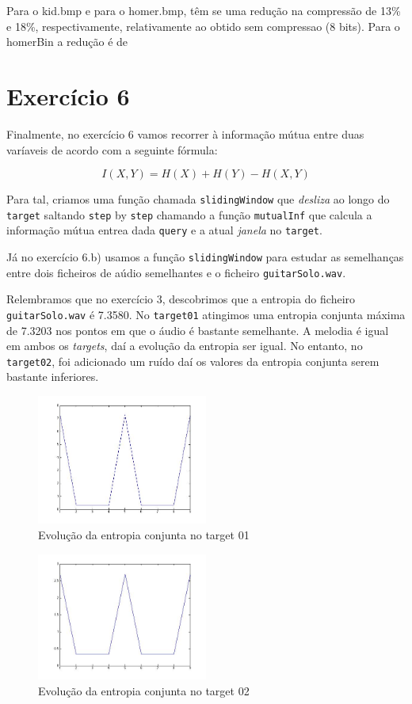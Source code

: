 \documentclass[12pt]{article}
\begin{document}
Para o kid.bmp e para o homer.bmp, têm se uma redução na compressão de 13\% e 18\%, respectivamente, relativamente ao obtido sem compressao (8 bits). Para o homerBin a redução é de 


\section*{Exercício 6}

  Finalmente, no exercício 6 vamos recorrer à informação mútua entre duas
  varíaveis de acordo com a seguinte fórmula:

  $$
    I(X,Y) = H(X) + H(Y) - H(X,Y)
  $$

  Para tal, criamos uma função chamada \texttt{slidingWindow} que
  \textit{desliza} ao longo do \texttt{target} saltando \texttt{step}
  by \texttt{step} chamando a função \texttt{mutualInf} que calcula a informação
  mútua entrea dada \texttt{query} e a atual \textit{janela} no \texttt{target}.

  Já no exercício 6.b) usamos a função \texttt{slidingWindow} para
  estudar as semelhanças entre dois ficheiros de aúdio semelhantes e
  o ficheiro \texttt{guitarSolo.wav}.

  Relembramos que no exercício 3, descobrimos que a entropia do ficheiro
  \texttt{guitarSolo.wav} é 7.3580. No \texttt{target01}
  atingimos uma entropia conjunta máxima de 7.3203 nos pontos em que
  o áudio é bastante semelhante. A melodia é igual em ambos os \textit{targets},
  daí a evolução da entropia ser igual. No entanto, no \texttt{target02},
  foi adicionado um ruído daí os valores da entropia conjunta serem
  bastante inferiores.

  \begin{figure}[H]
    \centering
    \includegraphics[width=0.5\textwidth]{ex6a}
    \caption{Evolução da entropia conjunta no target 01}
  \end{figure}

  \begin{figure}[H]
    \centering
    \includegraphics[width=0.5\textwidth]{ex6b}
    \caption{Evolução da entropia conjunta no target 02}
  \end{figure}
\end{document}
